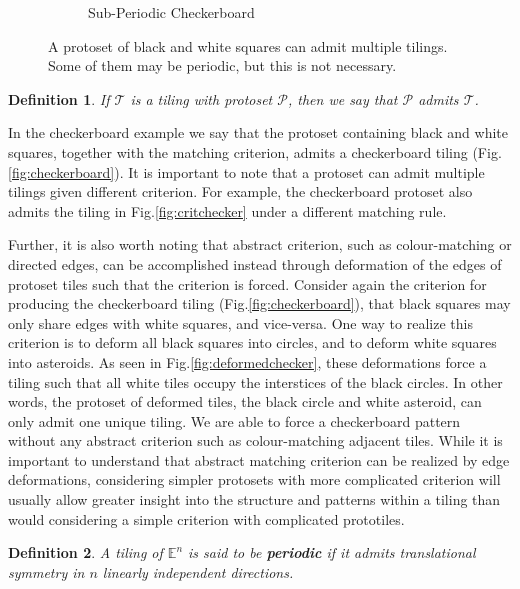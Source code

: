 \documentclass[
  oneside,
  11pt, a4paper,
  footinclude=true,
  headinclude=true,
  cleardoublepage=empty
]{scrbook}
\newtheorem{mydef}{Definition}
\begin{document}
\begin{figure}[H]
\begin{subfigure}[t]{0.4\textwidth}
    \caption{Sub-Periodic Checkerboard}
    \label{fig:aperiodicchecker}
\end{subfigure} 
\hspace*{\fill}
\label{fig:checker}
\caption[Checkerboard Tilings]{A protoset of black and white squares can admit multiple tilings. Some of them may be periodic, but this is not necessary.}
\end{figure}

\begin{mydef}
If $\mathcal{T}$ is a tiling with protoset $\mathcal{P}$, then we say that $\mathcal{P}$ admits $\mathcal{T}$.
\end{mydef}

In the checkerboard example we say that the protoset containing black and white squares, together with the matching criterion, admits a checkerboard tiling (Fig.\ref{fig:checkerboard}). It is important to note that a protoset can admit multiple tilings given different criterion. For example, the checkerboard protoset also admits the tiling in Fig.\ref{fig:critchecker} under a different matching rule. 

Further, it is also worth noting that abstract criterion, such as colour-matching or directed edges, can be accomplished instead through deformation of the edges of protoset tiles such that the criterion is forced. Consider again the criterion for producing the checkerboard tiling (Fig.\ref{fig:checkerboard}), that black squares may only share edges with white squares, and vice-versa. One way to realize this criterion is to deform all black squares into circles, and to deform white squares into asteroids. As seen in Fig.\ref{fig:deformedchecker}, these deformations force a tiling such that all white tiles occupy the interstices of the black circles. In other words, the protoset of deformed tiles, the black circle and white asteroid, can only admit one unique tiling. We are able to force a checkerboard pattern without any abstract criterion such as colour-matching adjacent tiles. While it is important to understand that abstract matching criterion can be realized by edge deformations, considering simpler protosets with more complicated criterion will usually allow greater insight into the structure and patterns within a tiling than would considering a simple criterion with complicated prototiles. 

\begin{mydef}
A tiling of  $\mathbb{E}^n$ is said to be \textbf{periodic} if it admits translational symmetry in $n$ linearly independent directions.
\end{mydef}
\end{document}
